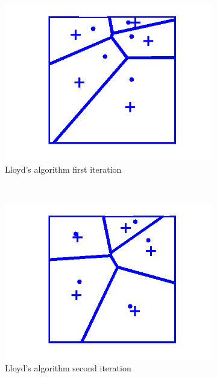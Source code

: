 \documentclass[11pt,a4paper,twocolumn]{article}
\begin{document}
\begin{figure}[h!]
\centering
\begin{subfigure}[b]{0.2\textwidth}
	\centering
	\includegraphics[width=\textwidth]{images/LloydsMethodIteration1.png}
	\caption{Lloyd's algorithm first iteration}
	\label{fig:lloyd1}
\end{subfigure}
~
\begin{subfigure}[b]{0.2\textwidth}
	\centering
	\includegraphics[width=\textwidth]{images/LloydsMethodIteration2.png}
	\caption{Lloyd's algorithm second iteration}
	\label{fig:lloyd2}
\end{subfigure}
~
\begin{subfigure}[b]{0.2\textwidth}
	\centering

\end{subfigure}
\end{figure}
\end{document}

